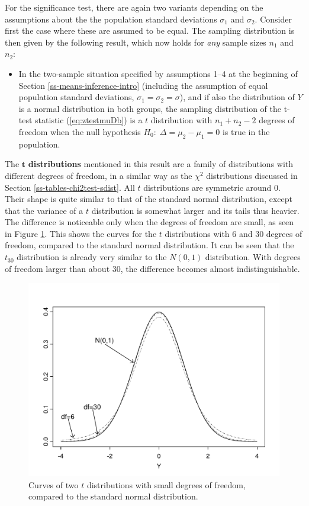 \documentclass[11pt,a4paper,openany]{book}
\providecommand{\tightlist}{%
  \setlength{\itemsep}{0pt}\setlength{\parskip}{0pt}}
\begin{document}
For the significance test, there are again two variants depending on the
assumptions about the the population standard deviations \(\sigma_{1}\)
and \(\sigma_{2}\). Consider first the case where these are assumed to
be equal. The sampling distribution is then given by the following
result, which now holds for \emph{any} sample sizes \(n_{1}\) and
\(n_{2}\):

\begin{itemize}
\tightlist
\item
  In the two-sample situation specified by assumptions 1--4 at the
  beginning of Section \ref{ss-means-inference-intro} (including the
  assumption of equal population standard deviations,
  \(\sigma_{1}=\sigma_{2}=\sigma\)), and if also the distribution of
  \(Y\) is a normal distribution in both groups, the sampling
  distribution of the t-test statistic (\ref{eq:ztestmuDb}) is a \(t\)
  distribution with \(n_{1}+n_{2}-2\) degrees of freedom when the null
  hypothesis \(H_{0}: \; \Delta=\mu_{2}-\mu_{1}=0\) is true in the
  population.
\end{itemize}

The \(\mathbf{t}\) \textbf{distributions} mentioned in this result are a
family of distributions with different degrees of freedom, in a similar
way as the \(\chi^{2}\) distributions discussed in Section
\ref{ss-tables-chi2test-sdist}. All \(t\) distributions are symmetric
around 0. Their shape is quite similar to that of the standard normal
distribution, except that the variance of a \(t\) distribution is
somewhat larger and its tails thus heavier. The difference is noticeable
only when the degrees of freedom are small, as seen in Figure
\ref{fig:f-tdistr1}. This shows the curves for the \(t\) distributions
with 6 and 30 degrees of freedom, compared to the standard normal
distribution. It can be seen that the \(t_{30}\) distribution is already
very similar to the \(N(0,1)\) distribution. With degrees of freedom
larger than about 30, the difference becomes almost indistinguishable.

\begin{figure}[htbp]
\centering
\includegraphics[width=13.00000cm]{tdistr1.pdf}
\caption{\label{fig:f-tdistr1} Curves of two \(t\) distributions with small
degrees of freedom, compared to the standard normal distribution.}
\end{figure}
\end{document}
